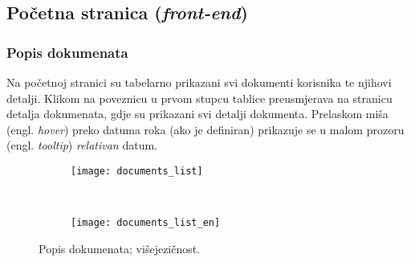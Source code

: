   \subsection{Početna stranica (\textit{front-end})}

    \subsubsection{Popis dokumenata}

      Na početnoj stranici su tabelarno prikazani svi dokumenti korisnika te
      njihovi detalji. Klikom na poveznicu u prvom stupcu tablice preusmjerava na
      stranicu detalja dokumenata, gdje su prikazani svi detalji dokumenta.
      Prelaskom miša (engl. \textit{hover}) preko datuma roka (ako je definiran)
      prikazuje se u malom prozoru (engl. \textit{tooltip}) \textit{relativan}
      datum.

      \begin{figure}[h]
        \centering
        \begin{subfigure}{\textwidth}
          \texttt{[image: documents\_list]}
        \end{subfigure}
        \\
        \begin{subfigure}{\textwidth}
          \texttt{[image: documents\_list\_en]}
        \end{subfigure}

        \caption{Popis dokumenata; višejezičnost.}
      \end{figure}
